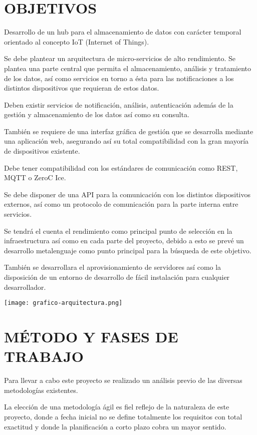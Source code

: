 \documentclass{pre-tfg}
\begin{document}
\section{OBJETIVOS}

Desarrollo de un hub para el almacenamiento de datos con carácter temporal orientado al
concepto IoT (Internet of Things).

Se debe plantear un arquitectura de micro-servicios de alto rendimiento. Se plantea una
parte central que permita el almacenamiento, análisis y tratamiento de los datos, así como
servicios en torno a ésta para las notificaciones a los distintos dispositivos que
requieran de estos datos.

Deben existir servicios de notificación, análisis, autenticación además de la gestión y
almacenamiento de los datos así como su consulta.

También se requiere de una interfaz gráfica de gestión que se desarrolla mediante una
aplicación web, asegurando así su total compatibilidad con la gran mayoría de dispositivos
existente.

Debe tener compatibilidad con los estándares de comunicación como REST, MQTT o ZeroC Ice.

Se debe disponer de una API para la comunicación con los distintos dispositivos externos,
así como un protocolo de comunicación para la parte interna entre servicios.

Se tendrá el cuenta el rendimiento como principal punto de selección en la infraestructura
así como en cada parte del proyecto, debido a esto se prevé un desarrollo metalenguaje
como punto principal para la búsqueda de este objetivo.

También se desarrollara el aprovisionamiento de servidores así como la disposición de un
entorno de desarrollo de fácil instalación para cualquier desarrollador.

\texttt{[image: grafico-arquitectura.png]}

\section{MÉTODO Y FASES DE TRABAJO}

Para llevar a cabo este proyecto se realizado un análisis previo de las diversas
metodologías existentes.

La elección de una metodología ágil es fiel reflejo de la naturaleza de este proyecto,
donde a fecha inicial no se define totalmente los requisitos con total exactitud y donde
la planificación a corto plazo cobra un mayor sentido.
\end{document}
